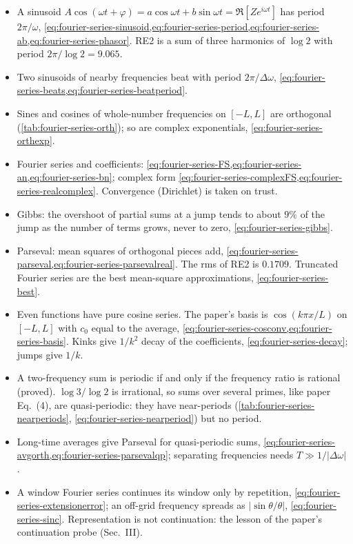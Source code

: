 \begin{itemize}
\item A sinusoid $A\cos(\omega t+\varphi)=a\cos\omega t+b\sin\omega t=\Re[Ze^{i\omega t}]$ has period $2\pi/\omega$, \cref{eq:fourier-series-sinusoid,eq:fourier-series-period,eq:fourier-series-ab,eq:fourier-series-phasor}. RE2 is a sum of three harmonics of $\log2$ with period $2\pi/\log2=9.065$.
\item Two sinusoids of nearby frequencies beat with period $2\pi/\Delta\omega$, \cref{eq:fourier-series-beats,eq:fourier-series-beatperiod}.
\item Sines and cosines of whole-number frequencies on $[-L,L]$ are orthogonal (\cref{tab:fourier-series-orth}); so are complex exponentials, \cref{eq:fourier-series-orthexp}.
\item Fourier series and coefficients: \cref{eq:fourier-series-FS,eq:fourier-series-an,eq:fourier-series-bn}; complex form \cref{eq:fourier-series-complexFS,eq:fourier-series-realcomplex}. Convergence (Dirichlet) is taken on trust.
\item Gibbs: the overshoot of partial sums at a jump tends to about $9\%$ of the jump as the number of terms grows, never to zero, \cref{eq:fourier-series-gibbs}.
\item Parseval: mean squares of orthogonal pieces add, \cref{eq:fourier-series-parseval,eq:fourier-series-parsevalreal}. The rms of RE2 is $0.1709$. Truncated Fourier series are the best mean-square approximations, \cref{eq:fourier-series-best}.
\item Even functions have pure cosine series. The paper's basis is $\cos(k\pi x/L)$ on $[-L,L]$ with $c_0$ equal to the average, \cref{eq:fourier-series-cosconv,eq:fourier-series-basis}. Kinks give $1/k^2$ decay of the coefficients, \cref{eq:fourier-series-decay}; jumps give $1/k$.
\item A two-frequency sum is periodic if and only if the frequency ratio is rational (proved). $\log3/\log2$ is irrational, so sums over several primes, like paper Eq.~(4), are quasi-periodic: they have near-periods (\cref{tab:fourier-series-nearperiods}, \cref{eq:fourier-series-nearperiod}) but no period.
\item Long-time averages give Parseval for quasi-periodic sums, \cref{eq:fourier-series-avgorth,eq:fourier-series-parsevalqp}; separating frequencies needs $T\gg1/|\Delta\omega|$.
\item A window Fourier series continues its window only by repetition, \cref{eq:fourier-series-extensionerror}; an off-grid frequency spreads as $|\sin\theta/\theta|$, \cref{eq:fourier-series-sinc}. Representation is not continuation: the lesson of the paper's continuation probe (Sec.~III).
\end{itemize}

